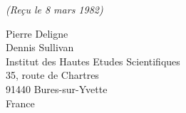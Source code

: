 \documentclass[10pt,a4paper]{article}
\begin{document}
\vspace{1.3em}
\hfill\textit{(Reçu le 8 mars 1982)}

\vspace{2.1em}
\noindent
Pierre Deligne\\
Dennis Sullivan\\[0.55em]
\hspace*{1.8em}Institut des Hautes Etudes Scientifiques\\
\hspace*{1.8em}35, route de Chartres\\
\hspace*{1.8em}91440 Bures-sur-Yvette\\
\hspace*{1.8em}France
\end{document}
